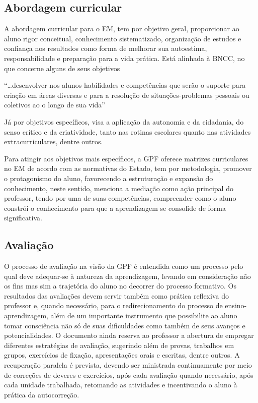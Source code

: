 \subsection{Abordagem curricular}
A abordagem curricular para o EM, tem por objetivo geral, proporcionar ao aluno rigor conceitual, conhecimento sistematizado, organização de estudos e confiança nos resultados como forma de melhorar sua autoestima, responsabilidade e preparação para a vida prática. Está alinhada à BNCC, no que concerne alguns de seus objetivos
\begin{citacao}
    ``\ldots desenvolver nos alunos habilidades e competências que serão o suporte para criação em áreas diversas e para a resolução de situações-problemas pessoais ou coletivos ao o longo de sua vida'' \cite[p. ~32]{GPTPPP:2021}
\end{citacao}
Já por objetivos específicos, visa a aplicação da autonomia e da cidadania, do senso crítico e da criatividade, tanto nas rotinas escolares quanto nas atividades extracurriculares, dentre outros.

Para atingir aos objetivos mais específicos, a GPF oferece matrizes curriculares no EM de acordo com as normativas do Estado, tem por metodologia, promover o protagonismo do aluno, favorecendo a estruturação e expansão do conhecimento, neste sentido, menciona a mediação como ação principal do professor, tendo por uma de suas competências, compreender como o aluno constrói o conhecimento para que a aprendizagem se consolide de forma significativa.

\subsection{Avaliação}
O processo de avaliação na visão da GPF é entendida como um processo pelo qual deve adequar-se à natureza da aprendizagem, levando em consideração não os fins mas sim a trajetória do aluno no decorrer do processo formativo. Os resultados das avaliações devem servir também como prática reflexiva do professor e, quando necessário, para o redirecionamento do processo de ensino-aprendizagem, além de um importante instrumento que possibilite ao aluno tomar consciência não só de suas dificuldades como também de seus avanços e potencialidades. O documento ainda reserva ao professor a abertura de empregar diferentes estratégias de avaliação, sugerindo além de provas, trabalhos em grupos, exercícios de fixação, apresentações orais e escritas, dentre outros. A recuperação paralela é prevista, devendo ser ministrada continuamente por meio de correções de deveres e exercícios, após cada avaliação quando necessário, após cada unidade trabalhada, retomando as atividades e incentivando o aluno à prática da autocorreção.
